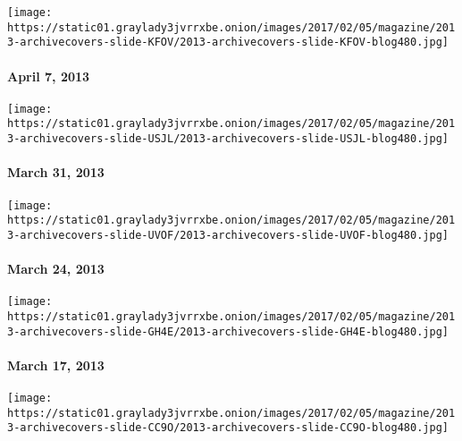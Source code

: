 \href{http://www.nytimes3xbfgragh.onion/indexes/2013/04/07/magazine/index.html}{}

\texttt{[image: https://static01.graylady3jvrrxbe.onion/images/2017/02/05/magazine/2013-archivecovers-slide-KFOV/2013-archivecovers-slide-KFOV-blog480.jpg]}

\hypertarget{april-7-2013}{%
\paragraph{April 7, 2013}\label{april-7-2013}}

\href{http://www.nytimes3xbfgragh.onion/indexes/2013/03/31/magazine/index.html}{}

\texttt{[image: https://static01.graylady3jvrrxbe.onion/images/2017/02/05/magazine/2013-archivecovers-slide-USJL/2013-archivecovers-slide-USJL-blog480.jpg]}

\hypertarget{march-31-2013}{%
\paragraph{March 31, 2013}\label{march-31-2013}}

\href{http://www.nytimes3xbfgragh.onion/indexes/2013/03/24/magazine/index.html}{}

\texttt{[image: https://static01.graylady3jvrrxbe.onion/images/2017/02/05/magazine/2013-archivecovers-slide-UVOF/2013-archivecovers-slide-UVOF-blog480.jpg]}

\hypertarget{march-24-2013}{%
\paragraph{March 24, 2013}\label{march-24-2013}}

\href{http://www.nytimes3xbfgragh.onion/indexes/2013/03/17/magazine/index.html}{}

\texttt{[image: https://static01.graylady3jvrrxbe.onion/images/2017/02/05/magazine/2013-archivecovers-slide-GH4E/2013-archivecovers-slide-GH4E-blog480.jpg]}

\hypertarget{march-17-2013}{%
\paragraph{March 17, 2013}\label{march-17-2013}}

\href{http://www.nytimes3xbfgragh.onion/indexes/2013/03/10/magazine/index.html}{}

\texttt{[image: https://static01.graylady3jvrrxbe.onion/images/2017/02/05/magazine/2013-archivecovers-slide-CC9O/2013-archivecovers-slide-CC9O-blog480.jpg]}

